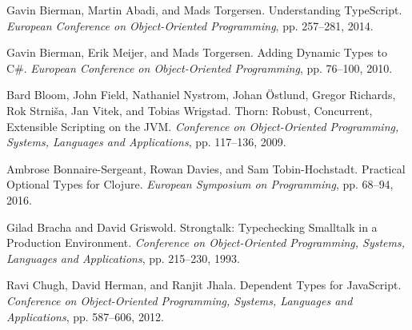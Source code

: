 \documentclass[screen=true, 10pt, acmsmall]{acmart}
\newenvironment{SingleColumn}{\begin{list}{}{\topsep=0pt\partopsep=0pt%
\listparindent=0pt\itemindent=0pt\labelwidth=0pt\leftmargin=0pt\rightmargin=0pt%
\itemsep=0pt\parsep=0pt}\item}{\end{list}}
\newenvironment{AutoBibliography}{\begin{small}}{\end{small}}
\newcommand{\Autobibentry}[1]{\hspace{0.05\linewidth}\parbox[t]{0.95\linewidth}{\parindent=-0.05\linewidth#1\vspace{1.0ex}}}
\begin{document}
\begin{AutoBibliography}
\begin{SingleColumn}
\label{t:x28autobib_x22Gavin_Biermanx2c_Martin_Abadix2c_and_Mads_TorgersenUnderstanding_TypeScriptEuropean_Conference_on_Objectx2dOriented_Programmingx2c_ppx2e_257x2dx2d2812014x22x29}\Autobibentry{Gavin Bierman, Martin Abadi, and Mads Torgersen. Understanding TypeScript. \textit{European Conference on Object{-}Oriented Programming}, pp. 257{--}281, 2014.}

\label{t:x28autobib_x22Gavin_Biermanx2c_Erik_Meijerx2c_and_Mads_TorgersenAdding_Dynamic_Types_to_Cx23European_Conference_on_Objectx2dOriented_Programmingx2c_ppx2e_76x2dx2d1002010x22x29}\Autobibentry{Gavin Bierman, Erik Meijer, and Mads Torgersen. Adding Dynamic Types to C\#. \textit{European Conference on Object{-}Oriented Programming}, pp. 76{--}100, 2010.}

\label{t:x28autobib_x22Bard_Bloomx2c_John_Fieldx2c_Nathaniel_Nystromx2c_Johan_xd6stlundx2c_Gregor_Richardsx2c_Rok_Strnix161ax2c_Jan_Vitekx2c_and_Tobias_WrigstadThornx3a_Robustx2c_Concurrentx2c_Extensible_Scripting_on_the_JVMConference_on_Objectx2dOriented_Programmingx2c_Systemsx2c_Languages_and_Applicationsx2c_ppx2e_117x2dx2d1362009x22x29}\Autobibentry{Bard Bloom, John Field, Nathaniel Nystrom, Johan \"{O}stlund, Gregor Richards, Rok Strni\v{s}a, Jan Vitek, and Tobias Wrigstad. Thorn: Robust, Concurrent, Extensible Scripting on the JVM. \textit{Conference on Object{-}Oriented Programming, Systems, Languages and Applications}, pp. 117{--}136, 2009.}

\label{t:x28autobib_x22Ambrose_Bonnairex2dSergeantx2c_Rowan_Daviesx2c_and_Sam_Tobinx2dHochstadtPractical_Optional_Types_for_ClojureEuropean_Symposium_on_Programmingx2c_ppx2e_68x2dx2d942016x22x29}\Autobibentry{Ambrose Bonnaire{-}Sergeant, Rowan Davies, and Sam Tobin{-}Hochstadt. Practical Optional Types for Clojure. \textit{European Symposium on Programming}, pp. 68{--}94, 2016.}

\label{t:x28autobib_x22Gilad_Bracha_and_David_GriswoldStrongtalkx3a_Typechecking_Smalltalk_in_a_Production_EnvironmentConference_on_Objectx2dOriented_Programmingx2c_Systemsx2c_Languages_and_Applicationsx2c_ppx2e_215x2dx2d2301993x22x29}\Autobibentry{Gilad Bracha and David Griswold. Strongtalk: Typechecking Smalltalk in a Production Environment. \textit{Conference on Object{-}Oriented Programming, Systems, Languages and Applications}, pp. 215{--}230, 1993.}

\label{t:x28autobib_x22Ravi_Chughx2c_David_Hermanx2c_and_Ranjit_JhalaDependent_Types_for_JavaScriptConference_on_Objectx2dOriented_Programmingx2c_Systemsx2c_Languages_and_Applicationsx2c_ppx2e_587x2dx2d6062012x22x29}\Autobibentry{Ravi Chugh, David Herman, and Ranjit Jhala. Dependent Types for JavaScript. \textit{Conference on Object{-}Oriented Programming, Systems, Languages and Applications}, pp. 587{--}606, 2012.}


\end{SingleColumn}
\end{AutoBibliography}
\end{document}
